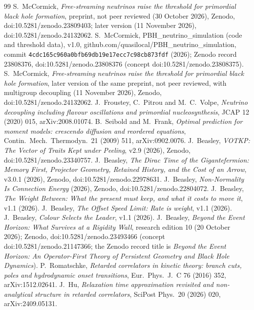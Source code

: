 \documentclass[11pt]{article}
\begin{document}
\begin{thebibliography}{99}
 S.~McCormick, \emph{Free-streaming neutrinos raise the threshold for primordial black hole formation}, preprint, not peer reviewed (30 October 2026), Zenodo, doi:10.5281/zenodo.23809403; later version (11 November 2026), doi:10.5281/zenodo.24132062.
 S.~McCormick, PBH\_neutrino\_simulation (code and threshold data), v1.0, github.com/quasilocal/PBH\_neutrino\_simulation, commit \texttt{4cdc165c960a0bfb69db19e17ecc7c98cb873fdf} (2026); Zenodo record 23808376, doi:10.5281/zenodo.23808376 (concept doi:10.5281/zenodo.23808375).
 S.~McCormick, \emph{Free-streaming neutrinos raise the threshold for primordial black hole formation}, later version of the same preprint, not peer reviewed, with multigroup decoupling (11 November 2026), Zenodo, doi:10.5281/zenodo.24132062.
 J.~Froustey, C.~Pitrou and M.~C.~Volpe, \emph{Neutrino decoupling including flavour oscillations and primordial nucleosynthesis}, JCAP 12 (2020) 015, arXiv:2008.01074.
 B.~Seibold and M.~Frank, \emph{Optimal prediction for moment models: crescendo diffusion and reordered equations}, Contin.\ Mech.\ Thermodyn.\ 21 (2009) 511, arXiv:0902.0076.
 J.~Beasley, \emph{VOTKP: The Vector of Traits Kept under Peeling}, v2.9 (2026), Zenodo, doi:10.5281/zenodo.23340757.
 J.~Beasley, \emph{The Dirac Time of the Gigantefermion: Memory First, Projector Geometry, Retained History, and the Cost of an Arrow}, v3.0.1 (2026), Zenodo, doi:10.5281/zenodo.22978631.
 J.~Beasley, \emph{Non-Normality Is Connection Energy} (2026), Zenodo, doi:10.5281/zenodo.22804072.
 J.~Beasley, \emph{The Weight Between: What the present must keep, and what it costs to move it}, v1.1 (2026).
 J.~Beasley, \emph{The Offset Speed Limit: Rate is weight}, v1.1 (2026).
 J.~Beasley, \emph{Colour Selects the Leader}, v1.1 (2026).
 J.~Beasley, \emph{Beyond the Event Horizon: What Survives at a Rigidity Wall}, research edition 10 (20 October 2026); Zenodo, doi:10.5281/zenodo.23493466 (concept doi:10.5281/zenodo.21147366; the Zenodo record title is \emph{Beyond the Event Horizon: An Operator-First Theory of Persistent Geometry and Black Hole Dynamics}).
 P.~Romatschke, \emph{Retarded correlators in kinetic theory: branch cuts, poles and hydrodynamic onset transitions}, Eur.\ Phys.\ J.\ C 76 (2016) 352, arXiv:1512.02641.
 J.~Hu, \emph{Relaxation time approximation revisited and non-analytical structure in retarded correlators}, SciPost Phys.\ 20 (2026) 020, arXiv:2409.05131.

\end{thebibliography}
\end{document}
